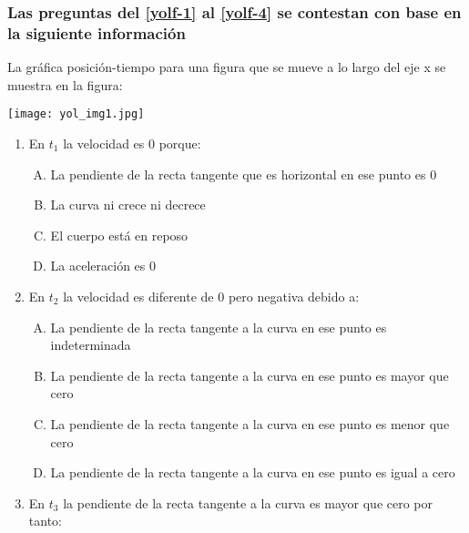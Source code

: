 \subsubsection*{Las preguntas del \ref{yolf-1} al \ref{yolf-4} se contestan con base en la siguiente información}

\noindent La gráfica posición-tiempo para una figura que se mueve a lo largo del eje x se muestra en la figura:

\begin{center}
\texttt{[image: yol\_img1.jpg]}
\end{center}



\begin{enumerate}
\item En $t_1$ la velocidad es 0 porque: \label{yolf-1}\\

\begin{enumerate}[(A)]
\item La pendiente de la recta tangente que es horizontal en ese punto es 0
\item  La curva ni crece ni decrece
\item  El cuerpo está en reposo
\item La aceleración es 0
\end{enumerate}


\newpage
\item En $t_2$ la velocidad es diferente de 0 pero negativa debido a:  \label{yolf-2}\\

\begin{enumerate}[(A)]
\item La pendiente de la recta tangente a la curva en ese punto es indeterminada
\item La pendiente de la recta tangente a la curva en ese punto es mayor que cero
\item  La pendiente de la recta tangente a la curva en ese punto es menor que cero
\item  La pendiente de la recta tangente a la curva en ese punto es igual a cero
\end{enumerate}

\item En $t_3$ la pendiente de la recta tangente a la curva es mayor que cero por tanto: \label{yolf-3}\\


\end{enumerate}
